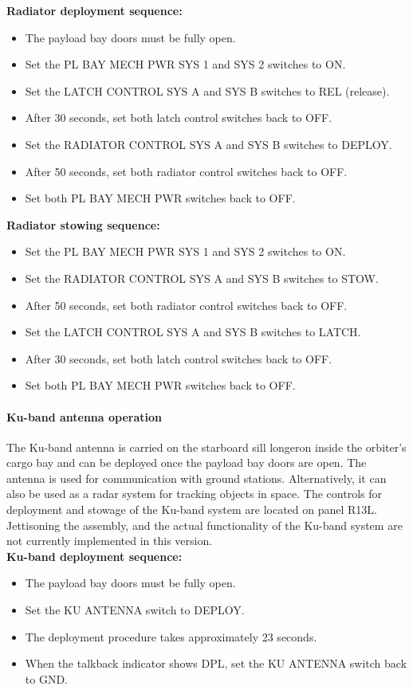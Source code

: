 \documentclass[Orbiter User Manual.tex]{subfiles}
\begin{document}
\noindent
\textbf{Radiator deployment sequence:}
\begin{itemize}
\item The payload bay doors must be fully open.
\item Set the PL BAY MECH PWR SYS 1 and SYS 2 switches to ON.
\item Set the LATCH CONTROL SYS A and SYS B switches to REL (release).
\item After 30 seconds, set both latch control switches back to OFF.
\item Set the RADIATOR CONTROL SYS A and SYS B switches to DEPLOY.
\item After 50 seconds, set both radiator control switches back to OFF.
\item Set both PL BAY MECH PWR switches back to OFF.
\end{itemize}

\noindent
\textbf{Radiator stowing sequence:}
\begin{itemize}
\item Set the PL BAY MECH PWR SYS 1 and SYS 2 switches to ON.
\item Set the RADIATOR CONTROL SYS A and SYS B switches to STOW.
\item After 50 seconds, set both radiator control switches back to OFF.
\item Set the LATCH CONTROL SYS A and SYS B switches to LATCH.
\item After 30 seconds, set both latch control switches back to OFF.
\item Set both PL BAY MECH PWR switches back to OFF.
\end{itemize}

\paragraph{Ku-band antenna operation}
The Ku-band antenna is carried on the starboard sill longeron inside the orbiter's cargo bay and can be deployed once the payload bay doors are open. The antenna is used for communication with ground stations. Alternatively, it can also be used as a radar system for tracking objects in space. The controls for deployment and stowage of the Ku-band system are located on panel R13L. Jettisoning the assembly, and the actual functionality of the Ku-band system are not currently implemented in this version.\\

\noindent
\textbf{Ku-band deployment sequence:}
\begin{itemize}
\item The payload bay doors must be fully open.
\item Set the KU ANTENNA switch to DEPLOY.
\item The deployment procedure takes approximately 23 seconds.
\item When the talkback indicator shows DPL, set the KU ANTENNA switch back to GND.
\end{itemize}
\end{document}
